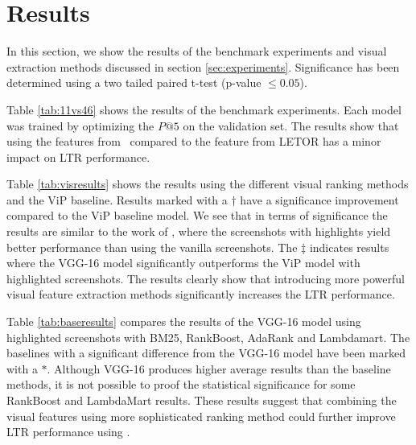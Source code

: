 \section{Results}
In this section, we show the results of the benchmark experiments and visual extraction methods discussed in section \ref{sec:experiments}. Significance has been determined using a two tailed paired t-test (p-value $\leq 0.05$). 

Table \ref{tab:11vs46} shows the results of the benchmark experiments. Each model was trained by optimizing the $P@5$ on the validation set. The results show that using the features from \datasetname~compared to the feature from LETOR has a minor impact on \ac{LTR} performance.  

Table \ref{tab:visresults} shows the results using the different visual ranking methods and the ViP baseline. 
Results marked with a $\dagger$ have a significance improvement compared to the ViP baseline model. 
We see that in terms of significance the results are similar to the work of \citet{fan2017learning}, where the screenshots with highlights yield better performance than using the vanilla screenshots. The $\ddagger$ indicates results where the VGG-16 model significantly outperforms the ViP model with highlighted screenshots. The results clearly show that introducing more powerful visual feature extraction methods significantly increases the \ac{LTR} performance.

Table \ref{tab:baseresults} compares the results of the VGG-16 model using highlighted screenshots with BM25, RankBoost, AdaRank and Lambdamart. The baselines with a significant difference from the VGG-16 model have been marked with a $*$. Although VGG-16 produces higher average results than the baseline methods, it is not possible to proof the statistical significance for some RankBoost and LambdaMart results. These results suggest that combining the visual features using more sophisticated ranking method could further improve \ac{LTR} performance using \datasetname. 